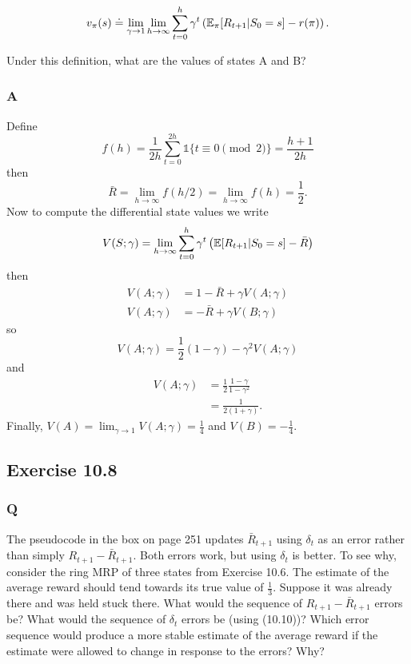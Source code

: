 \[
    v_\pi(s) \doteq \lim_{\gamma \to 1} \lim_{h \to \infty} \sum_{t=0}^h \gamma^t \left( \mathbb{E}_\pi{}[R_{t+1} \vert{} S_0 = s] - r(\pi) \right).
\]

Under this definition, what are the values of states A and B?
\subsubsection*{A}
Define
\[
    f(h) = \frac{1}{2h} \sum_{t=0}^{2h} \mathds{1}\{t \equiv 0 \pmod 2\} = \frac{h + 1}{2h}
\]
then
\[
    \bar{R} = \lim_{h \to \infty}f(h/2) = \lim_{h \to \infty}f(h) = \frac12.
\]
Now to compute the differential state values we write
\[
    V(S; \gamma) = \lim_{h\to \infty} \sum_{t=0}^h \gamma^t \left( \mathbb{E}{}[R_{t+1} \vert{} S_0 = s] - \bar{R} \right)
\]
then
\begin{align*}
    V(A; \gamma) &= 1 - \bar{R} + \gamma V(A; \gamma) \\ 
    V(A; \gamma) &= - \bar{R} + \gamma V(B; \gamma)
\end{align*}
so
\[
    V(A; \gamma) = \frac12 ( 1 - \gamma ) - \gamma^2 V(A; \gamma)
\]
and
\begin{align*}
    V(A; \gamma) &= \frac12 \frac{1 - \gamma}{1 - \gamma^2} \\
                 &= \frac{1}{2(1 + \gamma)}.
\end{align*}
Finally, $V(A) = \lim_{\gamma \to 1} V(A; \gamma) = \frac14$ and $V(B) = - \frac14$.
    
\subsection{Exercise 10.8}
\subsubsection*{Q}
The pseudocode in the box on page 251 updates $\bar{R}_{t+1}$ using $\delta_t$ as an error rather than simply $R_{t+1} - \bar{R}_{t+1}$. Both errors work, but using $\delta_t$ is better. To see why, consider the ring MRP of three states from Exercise 10.6. The estimate of the average
reward should tend towards its true value of $\frac13$. Suppose it was already there and was held stuck there. What would the sequence of $R_{t+1} - \bar{R}_{t+1}$ errors be? What would the sequence of $\delta_t$ errors be (using (10.10))? Which error sequence would produce a more stable estimate of the average reward if the estimate were allowed to change in response to the errors? Why?
 
